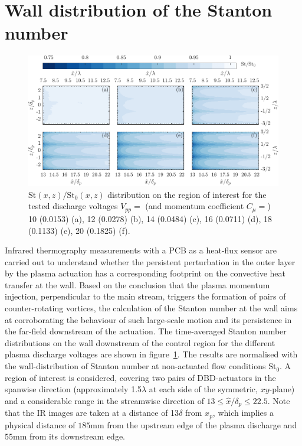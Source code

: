 \section{Wall distribution of the Stanton number}\label{s:resultsSF}
\begin{figure}[h]
         \centering
         \includegraphics[width=0.99\linewidth]{figures/results/St/st_rebut.pdf}
         \caption{$\mathrm{St}(x,z)/\mathrm{St_0}(x,z)$ distribution on the region of interest for the tested discharge voltages $V_{pp}=$  (and momentum coefficient $C_\mu = $) 10 (0.0153) (a), 12 (0.0278) (b), 14 (0.0484) (c), 16 (0.0711) (d), 18 (0.1133) (e), 20 (0.1825) (f).} \label{fig:st_maps} %
\end{figure}
Infrared thermography measurements with a PCB as a heat-flux sensor are carried out to understand whether the persistent perturbation in the outer layer by the plasma actuation has a corresponding footprint on the convective heat transfer at the wall. Based on the conclusion that the plasma momentum injection, perpendicular to the main stream, triggers the formation of pairs of counter-rotating vortices, the calculation of the Stanton number at the wall aims at corroborating the behaviour of such large-scale motion and its persistence in the far-field downstream of the actuation. 
The time-averaged Stanton number distributions on the wall downstream of the control region for the different plasma discharge voltages are shown in figure~\ref{fig:st_maps}. The results are normalised with the wall-distribution of Stanton number at non-actuated flow conditions $\mathrm{St}_0$. A region of interest is considered, covering two pairs of DBD-actuators in the spanwise direction (approximately 1.5$\lambda$ at each side of the symmetric, $xy$-plane) and a considerable range in the streamwise direction of $13\leq\hat{x}/\delta_p\leq 22.5$. Note that the IR images are taken at a distance of 13$\delta$ from $x_p$, which implies a physical distance of $185\mathrm{mm}$ from the upstream edge of the plasma discharge and $55\mathrm{mm}$ from its downstream edge.  

